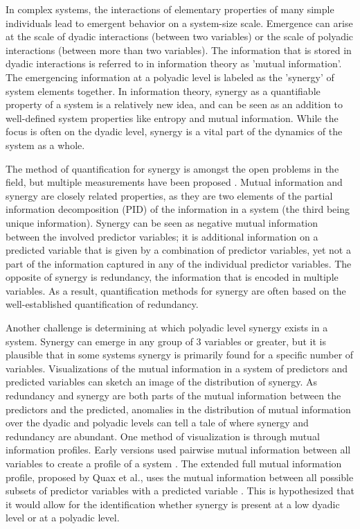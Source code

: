 \documentclass[../main.tex]{subfiles}
\begin{document}
In complex systems, the interactions of elementary properties of many simple individuals lead to emergent behavior on a system-size scale.
Emergence can arise at the scale of dyadic interactions (between two variables) or the scale of polyadic interactions (between more than two variables).
The information that is stored in dyadic interactions is referred to in information theory as 'mutual information'.
The emergencing information at a polyadic level is labeled as the 'synergy' of system elements together.
In information theory, synergy as a quantifiable property of a system is a relatively new idea, and can be seen as an addition to well-defined system properties like entropy and mutual information.
While the focus is often on the dyadic level, synergy is a vital part of the dynamics of the system as a whole.

The method of quantification for synergy is amongst the open problems in the field, but multiple measurements have been proposed \cite{olbrich2015information}.
Mutual information and synergy are closely related properties, as they are two elements of the partial information decomposition (PID) of the information in a system (the third being unique information).
Synergy can be seen as negative mutual information between the involved predictor variables; it is additional information on a predicted variable that is given by a combination of predictor variables, yet not a part of the information captured in any of the individual predictor variables.
The opposite of synergy is redundancy, the information that is encoded in multiple variables.
As a result, quantification methods for synergy are often based on the well-established quantification of redundancy.

Another challenge is determining at which polyadic level synergy exists in a system.
Synergy can emerge in any group of 3 variables or greater, but it is plausible that in some systems synergy is primarily found for a specific number of variables.
Visualizations of the mutual information in a system of predictors and predicted variables can sketch an image of the distribution of synergy.
As redundancy and synergy are both parts of the mutual information between the predictors and the predicted, anomalies in the distribution of mutual information over the dyadic and polyadic levels can tell a tale of where synergy and redundancy are abundant.
One method of visualization is through mutual information profiles.
Early versions used pairwise mutual information between all variables to create a profile of a system \cite{bar2013computationally}. 
The extended full mutual information profile, proposed by Quax et al., uses the mutual information between all possible subsets of predictor variables with a predicted variable \cite{quax2017quantifying}.
This is hypothesized that it would allow for the identification whether synergy is present at a low dyadic level or at a polyadic level.
\end{document}
